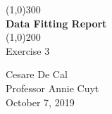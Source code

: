 \documentclass{article}
\begin{document}
\begin{titlepage}
	\begin{center}
	\line(1,0){300}\\
	[0.25in]
	\huge{\bfseries Data Fitting Report}  \\
	[2mm]
	\line(1,0){200} \\
	[1.5cm]
	\LARGE{Exercise 3} \\
	[12cm]
	\end{center}
	
	\begin{flushright}
	\large{Cesare De Cal \\
	[2mm]
	Professor Annie Cuyt \\
	[2mm]
	October 7, 2019}
	\end{flushright}
\end{titlepage}
\end{document}
